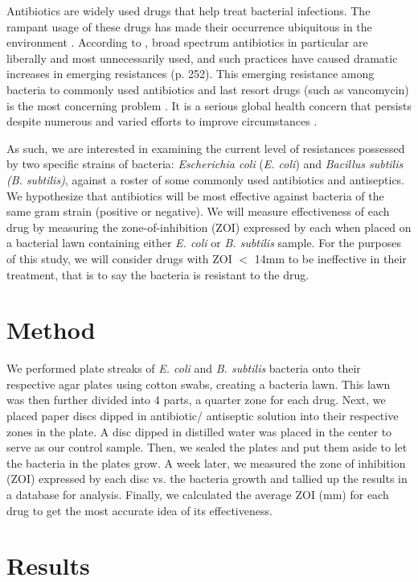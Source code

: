 \documentclass[11pt, twocolumn]{article}
\begin{document}
Antibiotics are widely used drugs that help treat bacterial infections. The rampant usage of these drugs has made their occurrence ubiquitous in the environment \citep{Gothwal_2015} . According to \citet{Akova_2016}, broad spectrum antibiotics in particular are liberally and most unnecessarily used, and such practices have caused dramatic increases in emerging resistances (p. 252). This emerging resistance among bacteria to commonly used antibiotics and last resort drugs (such as vancomycin) is the most concerning problem \citep{Urban-Chmiel_2022}. It is a serious global health concern that persists despite numerous and varied efforts to improve circumstances \citep{Velez_2016}. 

As such, we are interested in examining the current level of resistances possessed by two specific strains of bacteria:  \textit{Escherichia coli} (\textit{E. coli}) and \textit{Bacillus subtilis (B. subtilis)}, against a roster of some commonly used antibiotics and antiseptics. We hypothesize that antibiotics will be most effective against bacteria of the same gram strain (positive or negative). We will measure effectiveness of each drug by measuring the zone-of-inhibition (ZOI) expressed by each when placed on a bacterial lawn containing either \textit{E. coli} or \textit{B. subtilis} sample. For the purposes of this study, we will consider drugs with ZOI $<$ 14mm to be ineffective in their treatment, that is to say the bacteria is resistant to the drug.

\section{Method}

We performed plate streaks of \textit{E. coli} and \textit{B. subtilis} bacteria onto their respective agar plates using cotton swabs, creating a bacteria lawn. This lawn was then further divided into 4 parts, a quarter zone for each drug. Next, we placed paper discs dipped in antibiotic/ antiseptic solution into their respective zones in the plate. A disc dipped in distilled water was placed in the center to serve as our control sample. Then, we sealed the plates and put them aside to let the bacteria in the plates grow. A week later, we measured the zone of inhibition (ZOI) expressed by each disc vs. the bacteria growth and tallied up the results in a database for analysis. Finally, we calculated the average ZOI (mm) for each drug to get the most accurate idea of its effectiveness.

\section{Results}
\end{document}
